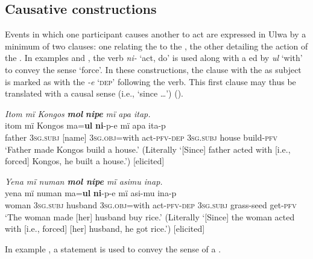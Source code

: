 
\subsection{Causative constructions}\label{sec:13.9.1}


  Events in which one participant causes another to act are expressed in Ulwa by a minimum of two clauses: one relating the  to the , the other detailing the action of the . In examples  and , the verb \textit{ni-} ‘act, do’ is used along with a  ed by \textit{ul} ‘with’ to convey the sense ‘force’. In these constructions, the clause with the  as subject is marked as  with the  \textit{-e} ‘\textsc{dep}’ following the verb. This first clause may thus be translated with a causal sense (i.e., ‘since …’) ().

\ea%
    \label{ex:syntax:349}
          \textit{Itom mï Kongos} \textbf{\textit{mol}} \textbf{\textit{nipe}} \textit{mï apa itap.}\\
\gll    itom  mï      Kongos  ma=\textbf{ul}      \textbf{ni}{}-p-e      mï apa    ita-p\\
    father  3\textsc{sg.subj}  [name]    3\textsc{sg.obj}=with  act-\textsc{pfv-dep}  \textsc{3sg.subj}    house  build-\textsc{pfv}\\
\glt `Father made Kongos build a house.’ (Literally ‘[Since] father acted with [i.e., forced] Kongos, he built a house.’) [elicited]
\z

\ea%
    \label{ex:syntax:350}
          \textit{Yena mï numan \textbf{mol nipe} mï asimu inap.}\\
\gll    yena  mï      numan    ma=\textbf{ul}      \textbf{ni}{}-p-e mï      asi-mu    ina-p\\
    woman  3\textsc{sg.subj}  husband  3\textsc{sg.obj}=with  act-\textsc{pfv-dep}    \textsc{3sg.subj}  grass-seed  get-\textsc{pfv}\\
\glt `The woman made [her] husband buy rice.’ (Literally ‘[Since] the woman acted with [i.e., forced] [her] husband, he got rice.’) [elicited]
\z

In example , a  statement is used to convey the  sense of a .

